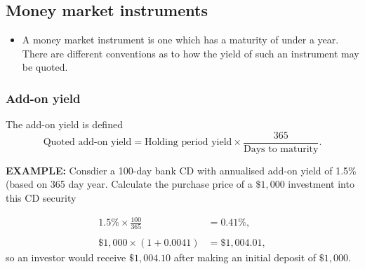 \documentclass[../notes_compiled.tex]{subfiles}
\begin{document}
\subsection{Money market instruments}
\begin{itemize}
\item A money market instrument is one which has a maturity of under a year. There are different conventions as to how the yield of such an instrument may be quoted.
\end{itemize}
\subsubsection{Add-on yield}
\begin{itemize}
\item The add-on yield is defined
\begin{equation}
\text{Quoted add-on yield}=\text{Holding period yield}\times\frac{365}{\text{Days to maturity}}.
\end{equation}
{\color{RedViolet}
\item[] \textbf{EXAMPLE:} Consdier a 100-day bank CD with annualised add-on yield of 1.5\% (based on 365 day year. Calculate the purchase price of a $\$1,000$ investment into this CD security
}
{\color{RoyalBlue}
\begin{align*}
1.5\% \times \frac{100}{365} &= 0.41\%, \\ \\
\$1,000 \times (1+0.0041) &= \$1,004.01,
\end{align*}
so an investor would receive $\$1,004.10$ after making an initial deposit of $\$1,000$.

}
\end{itemize}
\end{document}
